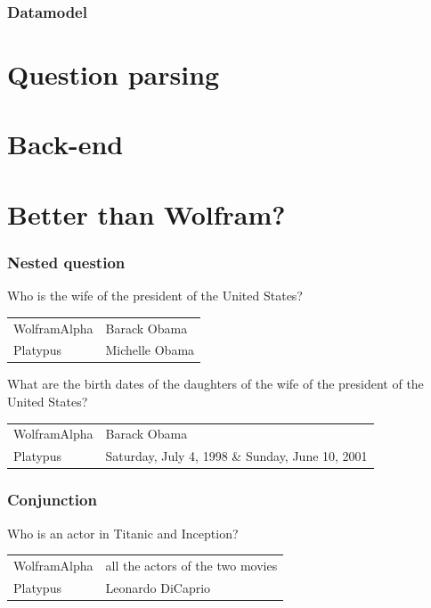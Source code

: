\documentclass[10pt, compress]{beamer}
\begin{document}
\begin{frame}[fragile]
    \frametitle{Datamodel}
\end{frame}

\section{Question parsing}

\section{Back-end}

\section{Better than Wolfram?}

\begin{frame}[fragile]
    \frametitle{Nested question}

Who is the wife of the president of the United States?
    \begin{tabular}{ll}
        \alert{WolframAlpha} & Barack Obama\\
        \alert{Platypus} & Michelle Obama\\
    \end{tabular}

    \medbreak

    What are the birth dates of the daughters of the wife of the president of the United States?
    \begin{tabular}{ll}
        \alert{WolframAlpha} & Barack Obama\\
        \alert{Platypus} & Saturday, July 4, 1998 \& Sunday, June 10, 2001\\
    \end{tabular}
\end{frame}

\begin{frame}[fragile]
    \frametitle{Conjunction}

Who is an actor in Titanic and Inception?
    \begin{tabular}{ll}
        \alert{WolframAlpha} & all the actors of the two movies\\
        \alert{Platypus} & Leonardo DiCaprio\\
    \end{tabular}
\end{frame}
\end{document}
